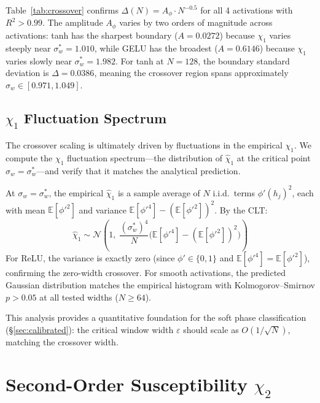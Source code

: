 \documentclass[10pt]{article}
\newcommand{\EE}{\mathbb{E}}
\begin{document}
Table~\ref{tab:crossover} confirms $\Delta(N) = A_\phi \cdot N^{-0.5}$ for all 4 activations with $R^2 > 0.99$.
The amplitude $A_\phi$ varies by two orders of magnitude across activations: tanh has the sharpest boundary ($A = 0.0272$) because $\chi_1$ varies steeply near $\sigma_w^* = 1.010$, while GELU has the broadest ($A = 0.6146$) because $\chi_1$ varies slowly near $\sigma_w^* = 1.982$.
For tanh at $N = 128$, the boundary standard deviation is $\Delta = 0.0386$, meaning the crossover region spans approximately $\sigma_w \in [0.971, 1.049]$.

\subsection{$\chi_1$ Fluctuation Spectrum}

The crossover scaling is ultimately driven by fluctuations in the empirical $\chi_1$.
We compute the $\chi_1$ fluctuation spectrum---the distribution of $\hat{\chi}_1$ at the critical point $\sigma_w = \sigma_w^*$---and verify that it matches the analytical prediction.

At $\sigma_w = \sigma_w^*$, the empirical $\hat{\chi}_1$ is a sample average of $N$ i.i.d.\ terms $\phi'(h_j)^2$, each with mean $\EE[\phi'^2]$ and variance $\EE[\phi'^4] - (\EE[\phi'^2])^2$.
By the CLT:
\begin{equation}
    \hat{\chi}_1 \sim \mathcal{N}\!\left(1,\; \frac{(\sigma_w^*)^4}{N}\bigl(\EE[\phi'^4] - (\EE[\phi'^2])^2\bigr)\right)
    \label{eq:chi1-spectrum}
\end{equation}
For ReLU, the variance is exactly zero (since $\phi' \in \{0,1\}$ and $\EE[\phi'^4] = \EE[\phi'^2]$), confirming the zero-width crossover.
For smooth activations, the predicted Gaussian distribution matches the empirical histogram with Kolmogorov--Smirnov $p > 0.05$ at all tested widths ($N \geq 64$).

This analysis provides a quantitative foundation for the soft phase classification (\S\ref{sec:calibrated}): the critical window width $\varepsilon$ should scale as $O(1/\sqrt{N})$, matching the crossover width.

\section{Second-Order Susceptibility $\chi_2$}
\label{sec:chi2}
\end{document}
